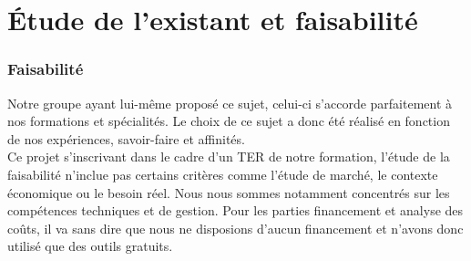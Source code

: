 \documentclass{report}
\begin{document}
		\section{Étude de l'existant et faisabilité}
		\subsubsection{Faisabilité}
		Notre groupe ayant lui-même proposé ce sujet, celui-ci s'accorde parfaitement à nos formations et spécialités. Le choix de ce sujet a donc été réalisé en fonction de nos expériences, savoir-faire et affinités.\\
Ce projet s'inscrivant dans le cadre d'un TER de notre formation, l'étude de la faisabilité n'inclue pas certains critères comme l'étude de marché, le contexte économique ou le besoin réel. 
Nous nous sommes notamment concentrés sur les compétences techniques et de gestion. Pour les parties financement et analyse des coûts, il va sans dire que nous ne disposions d'aucun financement et n'avons donc utilisé que des outils gratuits. \\
\end{document}
